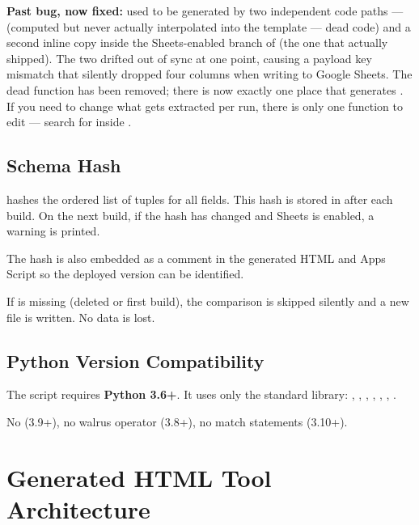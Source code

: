 \begin{warningbox}
\textbf{Past bug, now fixed:}  used to be generated by
two independent code paths ---  (computed
but never actually interpolated into the template --- dead code) and a
second inline copy inside the Sheets-enabled branch of 
(the one that actually shipped). The two drifted out of sync at one point,
causing a payload key mismatch that silently dropped four columns when
writing to Google Sheets. The dead function has been removed; there is now
exactly one place that generates . If you need to
change what gets extracted per run, there is only one function to edit ---
search for  inside .
\end{warningbox}

\section{Schema Hash}

 hashes the ordered list of
 tuples for all fields. This hash is stored in
 after each build. On the next build, if the hash has
changed and Sheets is enabled, a warning is printed.

The hash is also embedded as a comment in the generated HTML and Apps Script
so the deployed version can be identified.

\begin{notebox}
If  is missing (deleted or first build), the comparison
is skipped silently and a new file is written. No data is lost.
\end{notebox}

\section{Python Version Compatibility}

The script requires \textbf{Python 3.6+}. It uses only the standard library:
, , , , ,
, .

No  (3.9+), no walrus operator (3.8+), no match
statements (3.10+).

\chapter{Generated HTML Tool Architecture}

